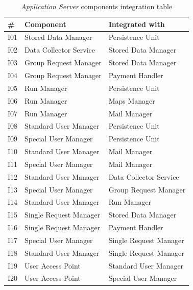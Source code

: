 \begin{center}
\begin{table}[H]
\begin{tabular}{ | l | p{} | p{} |}
  \hline
    \textbf{\#} & \textbf{Component} & \textbf{Integrated with} \\ \hline
    I01  & Stored Data Manager  & Persistence Unit \\ \hline
    I02  & Data Collector Service  & Stored Data Manager \\ \hline
    I03  & Group Request Manager  & Stored Data Manager \\ \hline
    I04  & Group Request Manager  & Payment Handler \\ \hline
    I05  & Run Manager & Persistence Unit \\ \hline
    I06  & Run Manager & Maps Manager \\ \hline
    I07  & Run Manager & Mail Manager \\ \hline
    I08  & Standard User Manager & Persistence Unit \\ \hline
    I09  & Special User Manager & Persistence Unit \\ \hline
    I10  & Standard User Manager & Mail Manager \\ \hline
    I11  & Special User Manager & Mail Manager \\ \hline
    I12  & Standard User Manager & Data Collector Service \\ \hline
    I13  & Special User Manager & Group Request Manager \\ \hline
    I14  & Standard User Manager & Run Manager \\ \hline
    I15  & Single Request Manager & Stored Data Manager \\ \hline
    I16  & Single Request Manager & Payment Handler \\ \hline
    I17  & Special User Manager & Single Request Manager \\ \hline
    I18  & Standard User Manager & Single Request Manager \\ \hline
    I19  & User Access Point & Standard User Manager \\ \hline
    I20  & User Access Point & Special User Manager \\ \hline
\end{tabular}
\caption{\textit{Application Server} components integration table}
\label{table:appServerIntegrationTable}
\end{table}
\end{center}

